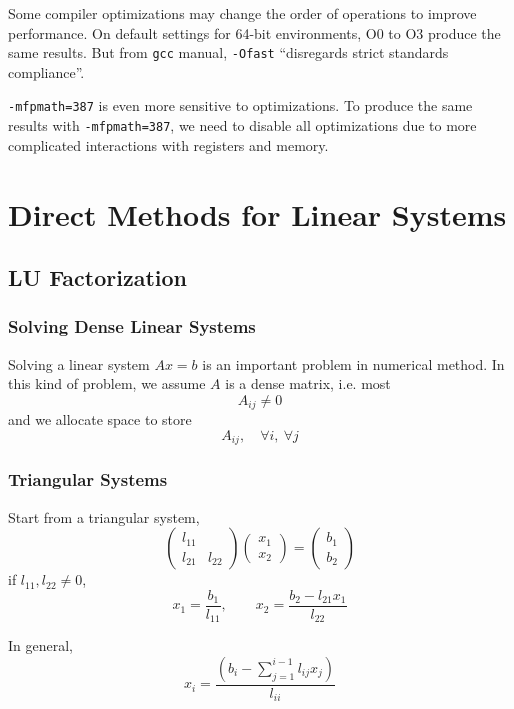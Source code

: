 Some compiler optimizations may change the order of operations to improve performance. On default settings for 64-bit environments, O0 to O3 produce the same results. But from \texttt{gcc} manual, \texttt{-Ofast} ``disregards strict standards compliance''.

\texttt{-mfpmath=387} is even more sensitive to optimizations. To produce the same results with \texttt{-mfpmath=387}, we need to disable all optimizations due to more complicated interactions with registers and memory.



\chapter{Direct Methods for Linear Systems}

\section{LU Factorization}

\subsection{Solving Dense Linear Systems}

Solving a linear system $Ax = b$ is an important problem in numerical method. In this kind of problem, we assume $A$ is a dense matrix, i.e. most \[
    A_{ij} \neq 0
\]
and we allocate space to store \[
    A_{ij}, \quad \forall i,\ \forall j
\]

\subsection{Triangular Systems}

Start from a triangular system, \[
    \begin{pmatrix}
        l_{11} & \\
        l_{21} & l_{22}
    \end{pmatrix} \begin{pmatrix}
        x_1 \\
        x_2
    \end{pmatrix} = \begin{pmatrix}
        b_1 \\
        b_2
    \end{pmatrix}
\]
if $l_{11}, l_{22} \neq 0$, \[
    x_1 = \frac{b_1}{l_{11}}, \qquad
    x_2 = \frac{b_2 - l_{21} x_1}{l_{22}}
\]
\begin{theorem}
    In general, \[
        x_i = \frac{\displaystyle \left(b_i - \sum_{j=1}^{i-1} l_{ij} x_j\right)}{l_{ii}}
    \]
\end{theorem}

